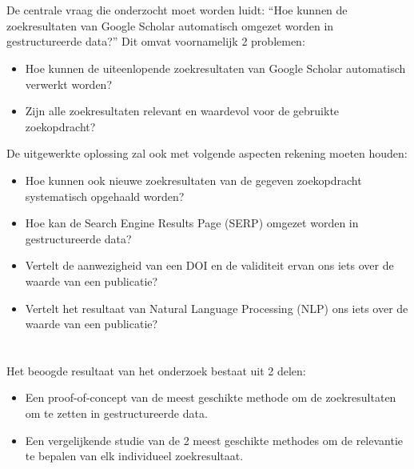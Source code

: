 \section{}%
\label{sec:onderzoeksvraag}

De centrale vraag die onderzocht moet worden luidt: ``Hoe kunnen de zoekresultaten van Google Scholar automatisch omgezet worden in gestructureerde data?''
Dit omvat voornamelijk 2 problemen:
\begin{itemize}
    \item Hoe kunnen de uiteenlopende zoekresultaten van Google Scholar automatisch verwerkt worden?
    \item Zijn alle zoekresultaten relevant en waardevol voor de gebruikte zoekopdracht?
\end{itemize}
De uitgewerkte oplossing zal ook met volgende aspecten rekening moeten houden:
\begin{itemize}
    \item Hoe kunnen ook nieuwe zoekresultaten van de gegeven zoekopdracht systematisch opgehaald worden?
    \item Hoe kan de Search Engine Results Page (SERP) omgezet worden in gestructureerde data?
    \item Vertelt de aanwezigheid van een DOI en de validiteit ervan ons iets over de waarde van een publicatie?
    \item Vertelt het resultaat van Natural Language Processing (NLP) ons iets over de waarde van een publicatie? 
\end{itemize}

\section{}%
\label{sec:onderzoeksdoelstelling}

Het beoogde resultaat van het onderzoek bestaat uit 2 delen:
\begin{itemize}
    \item Een proof-of-concept van de meest geschikte methode om de zoekresultaten om te zetten in gestructureerde data.
    \item Een vergelijkende studie van de 2 meest geschikte methodes om de relevantie te bepalen van elk individueel zoekresultaat.
\end{itemize}

\section{}%
\label{sec:opzet-bachelorproef}

